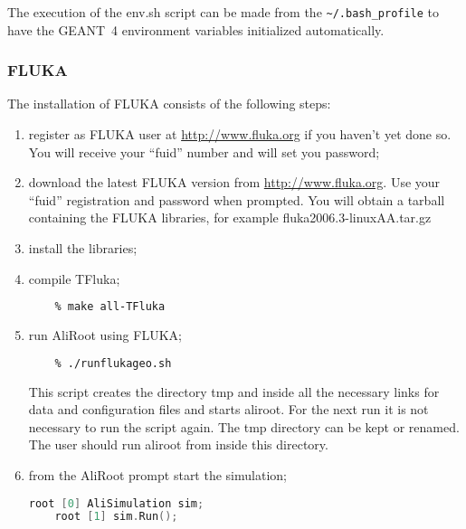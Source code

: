 \documentclass[12pt,a4paper,twoside]{article}
\begin{document}


The execution of the env.sh script can be made from the
\texttt{\~{}/.bash\_profile} to have the GEANT~4 environment variables
initialized automatically.

\subsubsection{FLUKA}

The installation of FLUKA\cite{FLUKA} consists of the following steps:

\begin{enumerate}

\item register as FLUKA user at \url{http://www.fluka.org} if you
  haven't yet done so. You will receive your ``fuid'' number and will set
  you password;

\item download the latest FLUKA version from
  \url{http://www.fluka.org}. Use your ``fuid'' registration and
  password when prompted. You will obtain a tarball containing the
  FLUKA libraries, for example fluka2006.3-linuxAA.tar.gz

\item install the libraries;

  

\item compile TFluka;

  \begin{lstlisting}[language=sh]
    % cd $ALICE_ROOT
    % make all-TFluka
  \end{lstlisting}

\item run AliRoot using FLUKA;
  \begin{lstlisting}[language=sh]
    % cd $ALICE_ROOT/TFluka/scripts
    % ./runflukageo.sh
  \end{lstlisting}

  This script creates the directory tmp and inside all the necessary
  links for data and configuration files and starts aliroot. For the
  next run it is not necessary to run the script again. The tmp
  directory can be kept or renamed. The user should run aliroot from
  inside this directory.

\item from the AliRoot prompt start the simulation;
  \begin{lstlisting}[language=C++]
    root [0] AliSimulation sim;
    root [1] sim.Run();
  \end{lstlisting}


\end{enumerate}
\end{document}
